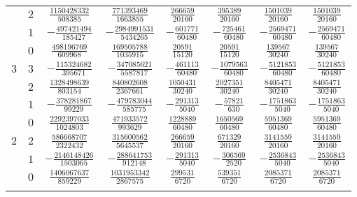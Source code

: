 \begin{table}
\begin{center}
\begin{tabular}{cccccccc}
           &  $2$  &  $ \frac{1150428332}{  508385}$  &  $ \frac{ 771393469}{ 1663855}$  &  $ \frac{ 266659}{20160}$  &  $ \frac{ 395389}{20160}$  &  $ \frac{ 1501039}{20160}$  &  $ \frac{ 1501039}{20160}$  \\ \addlinespace
           &  $1$  &  $-\frac{ 497421494}{  185427}$  &  $-\frac{2984991531}{ 5434265}$  &  $-\frac{ 601771}{60480}$  &  $-\frac{ 725461}{60480}$  &  $-\frac{ 2569471}{60480}$  &  $-\frac{ 2569471}{60480}$  \\ \addlinespace
           &  $0$  &  $ \frac{ 498196769}{  609968}$  &  $ \frac{ 169505788}{ 1035915}$  &  $ \frac{  20591}{15120}$  &  $ \frac{  20591}{15120}$  &  $ \frac{  139567}{30240}$  &  $ \frac{  139567}{30240}$  \\ \addlinespace
      $3$  &  $3$  &  $-\frac{ 115324682}{  395671}$  &  $-\frac{ 347085621}{ 5587817}$  &  $-\frac{ 461113}{60480}$  &  $-\frac{1079563}{60480}$  &  $-\frac{ 5121853}{60480}$  &  $-\frac{ 5121853}{60480}$  \\ \addlinespace
           &  $2$  &  $ \frac{1328498639}{  803154}$  &  $ \frac{ 840802608}{ 2367661}$  &  $ \frac{1050431}{30240}$  &  $ \frac{2027351}{30240}$  &  $ \frac{ 8405471}{30240}$  &  $ \frac{ 8405471}{30240}$  \\ \addlinespace
           &  $1$  &  $-\frac{ 378281867}{   99229}$  &  $-\frac{ 479783044}{  585775}$  &  $-\frac{ 291313}{ 5040}$  &  $-\frac{  57821}{  630}$  &  $-\frac{ 1751863}{ 5040}$  &  $-\frac{ 1751863}{ 5040}$  \\ \addlinespace
           &  $0$  &  $ \frac{2292397033}{ 1024803}$  &  $ \frac{ 471933572}{  993629}$  &  $ \frac{1228889}{60480}$  &  $ \frac{1650569}{60480}$  &  $ \frac{ 5951369}{60480}$  &  $ \frac{ 5951369}{60480}$  \\ \addlinespace
      $2$  &  $2$  &  $ \frac{ 586668707}{ 2322432}$  &  $ \frac{ 315600562}{ 5645537}$  &  $ \frac{ 266659}{20160}$  &  $ \frac{ 671329}{20160}$  &  $ \frac{ 3141559}{20160}$  &  $ \frac{ 3141559}{20160}$  \\ \addlinespace
           &  $1$  &  $-\frac{2146148426}{ 1503065}$  &  $-\frac{ 288641753}{  912148}$  &  $-\frac{ 291313}{ 5040}$  &  $-\frac{ 306569}{ 2520}$  &  $-\frac{ 2536843}{ 5040}$  &  $-\frac{ 2536843}{ 5040}$  \\ \addlinespace
           &  $0$  &  $ \frac{1406067637}{  859229}$  &  $ \frac{1031953342}{ 2867575}$  &  $ \frac{ 299531}{ 6720}$  &  $ \frac{ 539351}{ 6720}$  &  $ \frac{ 2085371}{ 6720}$  &  $ \frac{ 2085371}{ 6720}$  \\ \addlinespace

\end{tabular}
\end{center}
\end{table}
